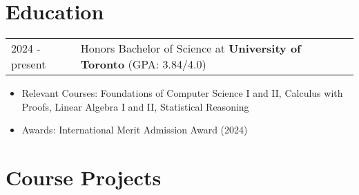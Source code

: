 \documentclass[a4paper,10pt]{article} %
\begin{document}
\section{Education}
\begin{tabularx}{\linewidth}{@{}l X@{}}
    2024 - present & Honors Bachelor of Science at \textbf{University of Toronto} \hfill \normalsize (GPA: 3.84/4.0) \\
\end{tabularx}
\begin{itemize}
    \item Relevant Courses: Foundations of Computer Science I and II, Calculus with Proofs, Linear Algebra I and II, Statistical Reasoning
    \item Awards: International Merit Admission Award (2024)
\end{itemize}


\section{Course Projects}
\end{document}
